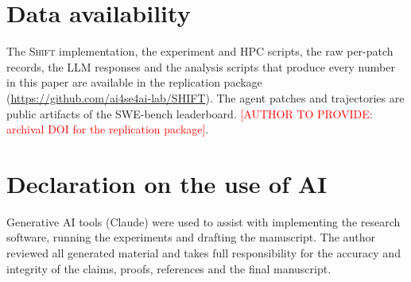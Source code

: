 \documentclass[a4paper,fleqn]{cas-sc}
\newcommand{\tool}{\textsc{Shift}}
\newcommand{\pending}[1]{\textcolor{red}{[#1]}}
\begin{document}
\section*{Data availability}
The \tool{} implementation, the experiment and HPC scripts, the raw per-patch records, the LLM responses and the analysis scripts that produce every number in this paper are available in the replication package (\url{https://github.com/ai4se4ai-lab/SHIFT}). The agent patches and trajectories are public artifacts of the SWE-bench leaderboard. \pending{AUTHOR TO PROVIDE: archival DOI for the replication package}.

\section*{Declaration on the use of AI}
Generative AI tools (Claude) were used to assist with implementing the research software, running the experiments and drafting the manuscript. The author reviewed all generated material and takes full responsibility for the accuracy and integrity of the claims, proofs, references and the final manuscript.



\end{document}
